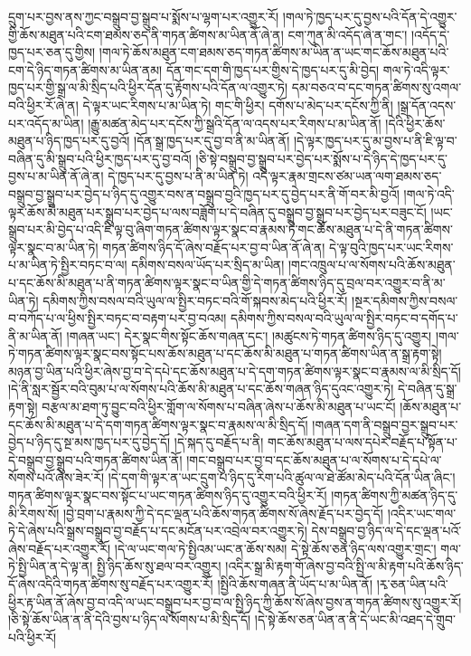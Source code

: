 དྲུག་པར་བྱས་ནས་ཀྱང་བསྒྲུབ་བྱ་སྒྲུབ་པ་སྨོས་པ་ལྷག་པར་འགྱུར་རོ། །གལ་ཏེ་ཁྱད་པར་དུ་བྱས་པའི་དོན་དེ་འགྱུར་གྱི་ཆོས་མཐུན་པའི་ངག་ཐམས་ཅད་ནི་གཏན་ཚིགས་མ་ཡིན་ནོ་ཞེ་ན། ངག་ཀུན་མི་འདོད་ཞེ་ན་གང་། །འདོད་དེ་ཁྱད་པར་ཅན་དུ་གྱིས། །གལ་ཏེ་ཆོས་མཐུན་ངག་ཐམས་ཅད་གཏན་ཚིགས་མ་ཡིན་ན་ཡང་གང་ཆོས་མཐུན་པའི་ངག་དེ་ཉིད་གཏན་ཚིགས་མ་ཡིན་ནམ། དོན་གང་དག་གི་ཁྱད་པར་གྱིས་དེ་ཁྱད་པར་དུ་མི་བྱེད། གལ་ཏེ་འདི་ལྟར་ཁྱད་པར་གྱི་སྒྲ་ལ་མི་སྲིད་པའི་ཕྱིར་དོན་དུ་རྟོགས་པའི་དོན་ལ་འགྱུར་ཏེ། དམ་བཅའ་བ་དང་གཏན་ཚིགས་སུ་འགལ་བའི་ཕྱིར་རོ་ཞེ་ན། དེ་ལྟར་ཡང་རིགས་པ་མ་ཡིན་ཏེ། གང་གི་ཕྱིར། དགོས་པ་མེད་པར་དངོས་ཀྱི་ནི། །སྒྲ་དོན་འདས་པར་འདོད་མ་ཡིན། །རྒྱུ་མཚན་མེད་པར་དངོས་ཀྱི་སྒྲའི་དོན་ལ་འདས་པར་རིགས་པ་མ་ཡིན་ནོ། །དེའི་ཕྱིར་ཆོས་མཐུན་པ་ཉིད་ཁྱད་པར་དུ་བྱའོ། །དོན་སྒྲ་ཁྱད་པར་དུ་བྱ་བ་ནི་མ་ཡིན་ནོ། །དེ་ལྟར་ཁྱད་པར་དུ་མ་བྱས་པ་ནི་ཇི་ལྟ་བ་བཞིན་དུ་མི་སྒྲུབ་པའི་ཕྱིར་ཁྱད་པར་དུ་བྱ་བའོ། །ཅི་སྟེ་བསྒྲུབ་བྱ་སྒྲུབ་པར་བྱེད་པར་སྨོས་པ་དེ་ཉིད་དེ་ཁྱད་པར་དུ་བྱས་པ་མ་ཡིན་ནོ་ཞེ་ན། དེ་ཁྱད་པར་དུ་བྱས་པ་ནི་མ་ཡིན་ཏེ། འདི་ལྟར་རྣམ་གྲངས་ཙམ་ཡན་ལག་ཐམས་ཅད་བསྒྲུབ་བྱ་སྒྲུབ་པར་བྱེད་པ་ཉིད་དུ་འགྱུར་བས་ན་བསྒྲུབ་བྱའི་ཁྱད་པར་དུ་བྱེད་པར་ནི་གོ་བར་མི་བྱའོ། །གལ་ཏེ་འདི་ལྟར་ཆོས་མི་མཐུན་པར་སྒྲུབ་པར་བྱེད་པ་ལས་བཟློག་པ་དེ་བཞིན་དུ་བསྒྲུབ་བྱ་སྒྲུབ་པར་བྱེད་པར་བཟུང་ངོ། །ཡང་སྒྲུབ་པར་མི་བྱེད་པ་འདི་ཇི་ལྟ་བུ་ཞིག་གཏན་ཚིགས་ལྟར་སྣང་བ་རྣམས་ཏེ་གང་ཆོས་མཐུན་པ་དེ་ནི་གཏན་ཚིགས་ལྟར་སྣང་བ་མ་ཡིན་ཏེ། གཏན་ཚིགས་ཉིད་དོ་ཞེས་བརྗོད་པར་བྱ་བ་ཡིན་ནོ་ཞེ་ན། དེ་ལྟ་བུའི་ཁྱད་པར་ཡང་རིགས་པ་མ་ཡིན་ཏེ་སྤྱིར་བཏང་བ་ལ། དམིགས་བསལ་ཡོད་པར་སྲིད་མ་ཡིན། །གང་འཁྲུལ་པ་ལ་སོགས་པའི་ཆོས་མཐུན་པ་དང་ཆོས་མི་མཐུན་པ་ནི་གཏན་ཚིགས་ལྟར་སྣང་བ་ཡིན་གྱི་དེ་གཏན་ཚིགས་ཉིད་དུ་བྲལ་བར་འགྱུར་བ་ནི་མ་ཡིན་ཏེ། དམིགས་ཀྱིས་བསལ་བའི་ཡུལ་ལ་སྤྱིར་བཏང་བའི་གོ་སྐབས་མེད་པའི་ཕྱིར་རོ། །སྔར་དམིགས་ཀྱིས་བསལ་བ་བཀོད་པ་ལ་ཕྱིས་སྤྱིར་བཏང་བ་བརྟག་པར་བྱ་བའམ། དམིགས་ཀྱིས་བསལ་བའི་ཡུལ་ལ་སྤྱིར་བཏང་བ་དགོད་པ་ནི་མ་ཡིན་ནོ། །གཞན་ཡང་། དེར་སྣང་གིས་སྟོང་ཆོས་གཞན་དང་། །མཚུངས་ཏེ་གཏན་ཚིགས་ཉིད་དུ་འགྱུར། །གལ་ཏེ་གཏན་ཚིགས་ལྟར་སྣང་བས་སྟོང་པས་ཆོས་མཐུན་པ་དང་ཆོས་མི་མཐུན་པ་གཏན་ཚིགས་ཡིན་ན་སྒྲ་རྟག་སྟེ། མཉན་བྱ་ཡིན་པའི་ཕྱིར་ཞེས་བྱ་བ་དེ་དཔེ་དང་ཆོས་མཐུན་པ་དེ་དག་གཏན་ཚིགས་ལྟར་སྣང་བ་རྣམས་ལ་མི་སྲིད་དོ། །དེ་ནི་སླར་སྦྱོར་བའི་བུམ་པ་ལ་སོགས་པའི་ཆོས་མི་མཐུན་པ་དང་ཆོས་གཞན་ཉིད་དུའང་འགྱུར་ཏེ། དེ་བཞིན་དུ་སྒྲ་རྟག་སྟེ། བརྩལ་མ་ཐག་ཏུ་བྱུང་བའི་ཕྱིར་གློག་ལ་སོགས་པ་བཞིན་ཞེས་པ་ཆོས་མི་མཐུན་པ་ཡང་ངོ། །ཆོས་མཐུན་པ་དང་ཆོས་མི་མཐུན་པ་དེ་དག་གཏན་ཚིགས་ལྟར་སྣང་བ་རྣམས་ལ་མི་སྲིད་དོ། །གཞན་དག་ནི་བསྒྲུབ་བྱར་སྒྲུབ་པར་བྱེད་པ་ཉིད་དུ་སྔ་མས་ཁྱད་པར་དུ་བྱེད་དོ། །དེ་སྐད་དུ་བརྗོད་པ་ནི། གང་ཆོས་མཐུན་པ་ལས་དཔེར་བརྗོད་པ་སྟོན་པ་དེ་བསྒྲུབ་བྱ་སྒྲུབ་པའི་གཏན་ཚིགས་ཡིན་ནོ། །གང་བསྒྲུབ་པར་བྱ་བ་དང་ཆོས་མཐུན་པ་ལ་སོགས་པ་དེ་དཔེ་ལ་སོགས་པའོ་ཞེས་ཟེར་རོ། །དེ་དག་གི་ལྟར་ན་ཡང་དྲུག་པ་ཉིད་དུ་རིག་པའི་ཚུལ་ལ་ཐེ་ཚོམ་མེད་པའི་དོན་ཡིན་ཞིང་། གཏན་ཚིགས་ལྟར་སྣང་བས་སྟོང་པ་ཡང་གཏན་ཚིགས་ཉིད་དུ་འགྱུར་བའི་ཕྱིར་རོ། །གཏན་ཚིགས་ཀྱི་མཚན་ཉིད་དུ་མི་རིགས་སོ། །བྱེ་བྲག་པ་རྣམས་ཀྱི་དེ་དང་ལྡན་པའི་ཆོས་གཏན་ཚིགས་སོ་ཞེས་རྗོད་པར་བྱེད་དོ། །འདིར་ཡང་གལ་ཏེ་དེ་ཞེས་པའི་སྒྲས་བསྒྲུབ་བྱ་བརྗོད་པ་དང་མངོན་པར་འབྲེལ་བར་འགྱུར་ཏེ། དེས་བསྒྲུབ་བྱ་ཉིད་ལ་དེ་དང་ལྡན་པའོ་ཞེས་བརྗོད་པར་འགྱུར་རོ། །དེ་ལ་ཡང་གལ་ཏེ་སྤྱིའམ་ཡང་ན་ཆོས་སམ། དེ་སྟེ་ཆོས་ཅན་ཉིད་ལས་འགྱུར་གྲང་། གལ་ཏེ་སྤྱི་ཡིན་ན་དེ་ལྟ་ན། སྤྱི་ཉིད་ཆོས་སུ་ཐལ་བར་འགྱུར། །འདིར་སྒྲ་མི་རྟག་གོ་ཞེས་བྱ་བའི་སྤྱི་ལ་མི་རྟག་པའི་ཆོས་ཉིད་དོ་ཞེས་འདིའི་གཏན་ཚིགས་སུ་བརྗོད་པར་འགྱུར་རོ། །སྤྱིའི་ཆོས་གཞན་ནི་ཡོད་པ་མ་ཡིན་ནོ། །རྭ་ཅན་ཡིན་པའི་ཕྱིར་རྟ་ཡིན་ནོ་ཞེས་བྱ་བ་འདི་ལ་ཡང་བསྒྲུབ་པར་བྱ་བ་ལ་སྤྱི་ཉིད་ཀྱི་ཆོས་སོ་ཞེས་བྱས་ན་གཏན་ཚིགས་སུ་འགྱུར་རོ། །ཅི་སྟེ་ཆོས་ཡིན་ན་ནི་དེའི་བྱས་པ་ཉིད་ལ་སོགས་པ་མི་སྲིད་དོ། །དེ་སྟེ་ཆོས་ཅན་ཡིན་ན་ནི་དེ་ཡང་མི་འཐད་དེ་གྲུབ་པའི་ཕྱིར་རོ། 